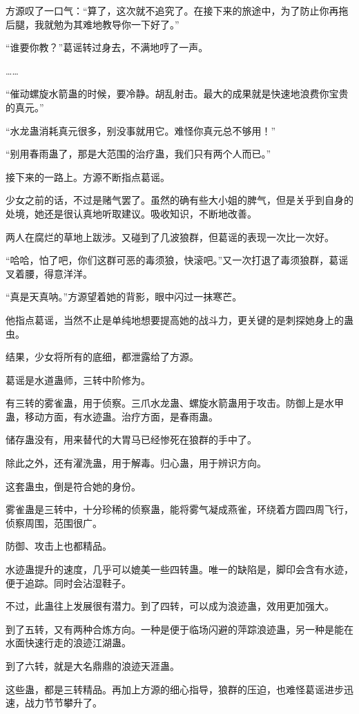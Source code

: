 \begin{this_body}
方源叹了一口气：“算了，这次就不追究了。在接下来的旅途中，为了防止你再拖后腿，我就勉为其难地教导你一下好了。”

“谁要你教？”葛谣转过身去，不满地哼了一声。

……

“催动螺旋水箭蛊的时候，要冷静。胡乱射击。最大的成果就是快速地浪费你宝贵的真元。”

“水龙蛊消耗真元很多，别没事就用它。难怪你真元总不够用！”

“别用春雨蛊了，那是大范围的治疗蛊，我们只有两个人而已。”

接下来的一路上。方源不断指点葛谣。

少女之前的话，不过是赌气罢了。虽然的确有些大小姐的脾气，但是关乎到自身的处境，她还是很认真地听取建议。吸收知识，不断地改善。

两人在腐烂的草地上跋涉。又碰到了几波狼群，但葛谣的表现一次比一次好。

“哈哈，怕了吧，你们这群可恶的毒须狼，快滚吧。”又一次打退了毒须狼群，葛谣叉着腰，得意洋洋。

“真是天真呐。”方源望着她的背影，眼中闪过一抹寒芒。

他指点葛谣，当然不止是单纯地想要提高她的战斗力，更关键的是刺探她身上的蛊虫。

结果，少女将所有的底细，都泄露给了方源。

葛谣是水道蛊师，三转中阶修为。

有三转的雾雀蛊，用于侦察。三爪水龙蛊、螺旋水箭蛊用于攻击。防御上是水甲蛊，移动方面，有水迹蛊。治疗方面，是春雨蛊。

储存蛊没有，用来替代的大胃马已经惨死在狼群的手中了。

除此之外，还有濯洗蛊，用于解毒。归心蛊，用于辨识方向。

这套蛊虫，倒是符合她的身份。

雾雀蛊是三转中，十分珍稀的侦察蛊，能将雾气凝成燕雀，环绕着方圆四周飞行，侦察周围，范围很广。

防御、攻击上也都精品。

水迹蛊提升的速度，几乎可以媲美一些四转蛊。唯一的缺陷是，脚印会含有水迹，便于追踪。同时会沾湿鞋子。

不过，此蛊往上发展很有潜力。到了四转，可以成为浪迹蛊，效用更加强大。

到了五转，又有两种合炼方向。一种是便于临场闪避的萍踪浪迹蛊，另一种是能在水面快速行走的浪迹江湖蛊。

到了六转，就是大名鼎鼎的浪迹天涯蛊。

这些蛊，都是三转精品。再加上方源的细心指导，狼群的压迫，也难怪葛谣进步迅速，战力节节攀升了。


\end{this_body}
